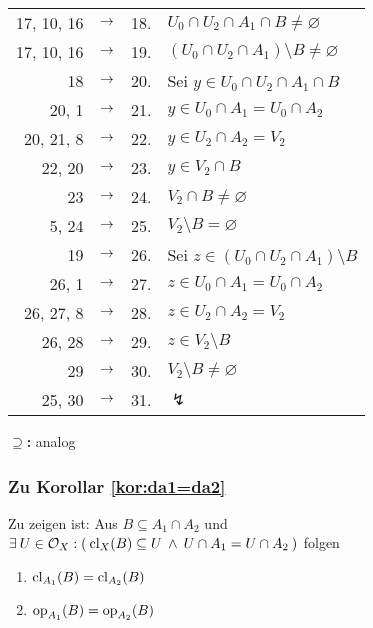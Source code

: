 \begin{longtable}{r c c l}
        17, 10, 16 & $\rightarrow$ & 18. & $U_0 \cap U_2 \cap A_1 \cap B \neq \varnothing$ \\
        17, 10, 16 & $\rightarrow$ & 19. & $(U_0 \cap U_2 \cap A_1) \setminus B \neq \varnothing$ \\
        18 & $\rightarrow$ & 20. & Sei $y \in U_0 \cap U_2 \cap A_1 \cap B$ \\
        20, 1 & $\rightarrow$ & 21. & $y \in U_0 \cap A_1 = U_0 \cap A_2$ \\
        20, 21, 8 & $\rightarrow$ & 22. & $y \in U_2 \cap A_2 = V_2$ \\
        22, 20 & $\rightarrow$ & 23. & $y \in V_2 \cap B$ \\
        23 & $\rightarrow$ & 24. & $V_2 \cap B \neq \varnothing$ \\
        5, 24 & $\rightarrow$ & 25. & $V_2 \setminus B = \varnothing$ \\
        19 & $\rightarrow$ & 26. & Sei $z \in (U_0 \cap U_2 \cap A_1) \setminus B$ \\
        26, 1 & $\rightarrow$ & 27. & $z \in U_0 \cap A_1 = U_0 \cap A_2$ \\
        26, 27, 8 & $\rightarrow$ & 28. & $z \in U_2 \cap A_2 = V_2$ \\
        26, 28 & $\rightarrow$ & 29. & $z \in V_2 \setminus B$ \\
        29 & $\rightarrow$ & 30. & $V_2 \setminus B \neq \varnothing$ \\
        25, 30 & $\rightarrow$ & 31. & $\lightning$ \\
    \end{longtable}

    \noindent
    \textbf{\glqq$\boldsymbol{\supseteq}$\grqq:} analog


\subsubsection{Zu Korollar \ref{kor:da1=da2}}\label{anh:kor.da1=da2}
    Zu zeigen ist: Aus $B \subseteq A_1 \cap A_2$ und  $\exists\: U \in \mathcal{O}_X : (\: \text{cl}_X(B) \subseteq U \:\land\: U \cap A_1 = U \cap A_2 \:)$ folgen
    \begin{enumerate}
        \item \label{anh:kor.da1=da2.1} $\text{cl}_{A_1}(B) = \text{cl}_{A_2}(B)$
        \item \label{anh:kor.da1=da2.2} $\text{op}_{A_1}(B) = \text{op}_{A_2}(B)$
    \end{enumerate} 
    \vspace{8pt}


